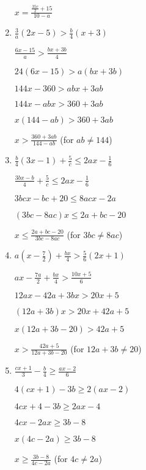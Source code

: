 \documentclass[10pt]{exam}
\begin{document}
\begin{multicols*}{2}
\begin{enumerate}
\( \displaystyle x = \frac{\frac{35c}{2} + 15}{10 - a} \)

\item \( \displaystyle \frac{3}{a}(2x - 5) > \frac{b}{4}(x + 3) \)

\( \displaystyle \frac{6x - 15}{a} > \frac{bx + 3b}{4} \)

\( \displaystyle 24(6x - 15) > a(bx + 3b) \)

\( \displaystyle 144x - 360 > abx + 3ab \)

\( \displaystyle 144x - abx > 360 + 3ab \)

\( \displaystyle x(144 - ab) > 360 + 3ab \)

\( \displaystyle x > \frac{360 + 3ab}{144 - ab} \) (for \( ab \neq 144 \))

\item \( \displaystyle \frac{b}{4}(3x - 1) + \frac{5}{c} \leq 2ax - \frac{1}{6} \)

\( \displaystyle \frac{3bx - b}{4} + \frac{5}{c} \leq 2ax - \frac{1}{6} \)

\( \displaystyle 3bcx - bc + 20 \leq 8acx - 2a \)

\( \displaystyle (3bc - 8ac)x \leq 2a + bc - 20 \)

\( \displaystyle x \leq \frac{2a + bc - 20}{3bc - 8ac} \) (for \( 3bc \neq 8ac \))

\item \( \displaystyle a(x - \frac{7}{2}) + \frac{bx}{4} > \frac{5}{6}(2x + 1) \)

\( \displaystyle ax - \frac{7a}{2} + \frac{bx}{4} > \frac{10x + 5}{6} \)

\( \displaystyle 12ax - 42a + 3bx > 20x + 5 \)

\( \displaystyle (12a + 3b)x > 20x + 42a + 5 \)

\( \displaystyle x(12a + 3b - 20) > 42a + 5 \)

\( \displaystyle x > \frac{42a + 5}{12a + 3b - 20} \) (for \( 12a + 3b \neq 20 \))

\item \( \displaystyle \frac{cx + 1}{3} - \frac{b}{4} \geq \frac{ax - 2}{6} \)

\( \displaystyle 4(cx + 1) - 3b \geq 2(ax - 2) \)

\( \displaystyle 4cx + 4 - 3b \geq 2ax - 4 \)

\( \displaystyle 4cx - 2ax \geq 3b - 8 \)

\( \displaystyle x(4c - 2a) \geq 3b - 8 \)

\( \displaystyle x \geq \frac{3b - 8}{4c - 2a} \) (for \( 4c \neq 2a \))


\end{enumerate}
\end{multicols*}
\end{document}
